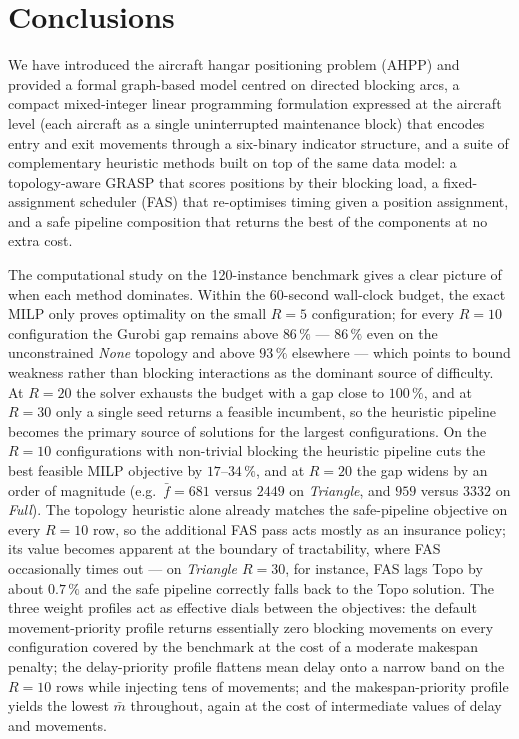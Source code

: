 \section{Conclusions}
\label{sec:conclusions}

We have introduced the aircraft hangar positioning problem (AHPP) and
provided a formal graph-based model centred on directed blocking arcs, a
compact mixed-integer linear programming formulation expressed at the
aircraft level (each aircraft as a single uninterrupted maintenance
block) that encodes entry and exit movements through a six-binary
indicator structure, and a suite of complementary heuristic methods
built on top of the same data model: a topology-aware GRASP that scores
positions by their blocking load, a fixed-assignment scheduler (FAS)
that re-optimises timing given a position assignment, and a safe
pipeline composition that returns the best of the components at no
extra cost.

The computational study on the 120-instance benchmark gives a clear
picture of when each method dominates.  Within the 60-second wall-clock
budget, the exact MILP only proves optimality on the small $R{=}5$
configuration; for every $R{=}10$ configuration the Gurobi gap remains
above $86\,\%$ --- $86\,\%$ even on the unconstrained \emph{None}
topology and above $93\,\%$ elsewhere --- which points to bound weakness
rather than blocking interactions as the dominant source of difficulty.
At $R{=}20$ the solver exhausts the budget with a gap close to
$100\,\%$, and at $R{=}30$ only a single seed returns a feasible
incumbent, so the heuristic pipeline becomes the primary source of
solutions for the largest configurations.  On
the $R{=}10$ configurations with non-trivial blocking the heuristic
pipeline cuts the best feasible MILP objective by $17$--$34\,\%$, and at
$R{=}20$ the gap widens by an order of magnitude (e.g.\ $\bar f = 681$
versus $2449$ on \emph{Triangle}, and $959$ versus $3332$ on
\emph{Full}).  The topology heuristic alone already matches the
safe-pipeline objective on every $R{=}10$ row, so the additional FAS
pass acts mostly as an insurance policy; its value becomes apparent at
the boundary of tractability, where FAS occasionally times out --- on
\emph{Triangle $R{=}30$}, for instance, FAS lags Topo by about $0.7\,\%$ and
the safe pipeline correctly falls back to the Topo solution.  The three
weight profiles act as effective dials between the objectives: the
default movement-priority profile returns essentially zero blocking
movements on every configuration covered by the benchmark at the cost
of a moderate makespan penalty; the delay-priority profile flattens
mean delay onto a narrow band on the $R{=}10$ rows while injecting tens
of movements; and the makespan-priority profile yields the lowest
$\bar m$ throughout, again at the cost of intermediate values of delay
and movements.

